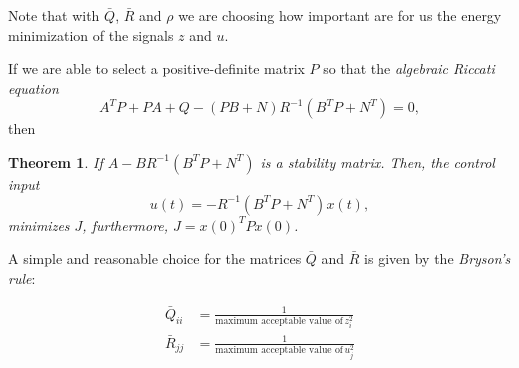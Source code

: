 \documentclass[11pt,a4paper,titlepage]{article}
\newtheorem{theorem}{Theorem}
\begin{document}
Note that with $\bar Q$, $\bar R$ and $\rho$ we are choosing how important are for us the energy minimization of the signals $z$ and $u$.

If we are able to select a positive-definite matrix $P$ so that the \emph{algebraic Riccati equation}
\begin{equation}
	A^TP + PA + Q - (PB + N)R^{-1}(B^TP + N^T) = 0,
\end{equation}
then
\begin{theorem}
	If $A - BR^{-1}(B^TP+N^T)$ is a stability matrix. Then, the control input
	\begin{equation}
	u(t) = -R^{-1}(B^TP+N^T) x(t),
	\end{equation}
	minimizes $J$, furthermore, $J = x(0)^T P x(0)$.
\end{theorem}

A simple and reasonable choice for the matrices $\bar Q$ and $\bar R$ is given by the \emph{Bryson's rule}:

\begin{align}
	\bar Q_{ii} &= \frac{1}{\text{maximum acceptable value of}\, z_i^2} \nonumber \\
	\bar R_{jj} &= \frac{1}{\text{maximum acceptable value of}\, u_j^2} \nonumber
\end{align}


\end{document}
